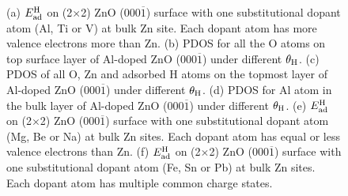 \begin{figure}[!htb]
\caption[H adsorptions on ZnO surfaces with different doping]{(a) $E_{\textup{ad}}^{\textup{H}}$ on (2$\times$2) ZnO (000$\overline{1}$) surface with one substitutional dopant atom (Al, Ti or V) at bulk Zn site. Each dopant atom has more valence electrons more than Zn. (b) \ac{PDOS} for all the O atoms on top surface layer of Al-doped ZnO (000$\overline{1}$) under different $\theta_{\textup{H}}$. (c) \ac{PDOS} of all O, Zn and adsorbed H atoms on the topmost layer of Al-doped ZnO (000$\overline{1}$) under different $\theta_{\textup{H}}$. (d) \ac{PDOS} for Al atom in the bulk layer of Al-doped ZnO (000$\overline{1}$) under different $\theta_{\textup{H}}$. (e) $E_{\textup{ad}}^{\textup{H}}$ on (2$\times$2) ZnO (000$\overline{1}$) surface with one substitutional dopant atom (Mg, Be or Na)  at bulk Zn sites. Each dopant atom has equal or less valence electrons than Zn. (f) $E_{\textup{ad}}^{\textup{H}}$ on (2$\times$2) ZnO (000$\overline{1}$) surface with one substitutional dopant atom (Fe, Sn or Pb) at bulk Zn sites. Each dopant atom has multiple common charge states.}
\label{Chap:ZnO_H:fig:doped}
\end{figure}
\endgroup

